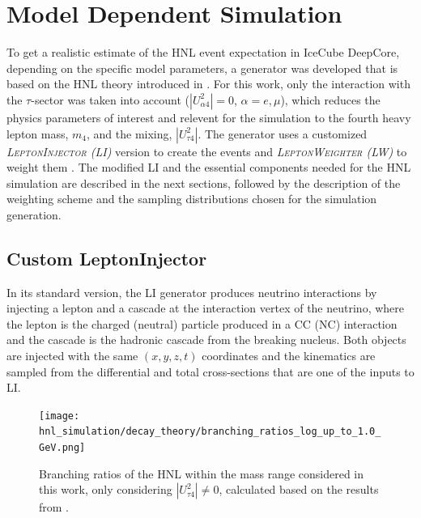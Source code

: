 \section{Model Dependent Simulation} 

To get a realistic estimate of the HNL event expectation in IceCube DeepCore, depending on the specific model parameters, a generator was developed that is based on the HNL theory introduced in . For this work, only the interaction with the $\tau$-sector was taken into account ($|U_{\alpha4}^2|=0$, $\alpha=e,\mu$), which reduces the physics parameters of interest and relevent for the simulation to the fourth heavy lepton mass, $m_4$, and the mixing, $|U_{\tau4}^2|$. The generator uses a customized \textit{\textsc{LeptonInjector} (LI)} version to create the events and \textit{\textsc{LeptonWeighter} (LW)} to weight them . The modified LI and the essential components needed for the HNL simulation are described in the next sections, followed by the description of the weighting scheme and the sampling distributions chosen for the simulation generation.


\subsection{Custom LeptonInjector} 

In its standard version, the LI generator produces neutrino interactions by injecting a lepton and a cascade at the interaction vertex of the neutrino, where the lepton is the charged (neutral) particle produced in a CC (NC) interaction and the cascade is the hadronic cascade from the breaking nucleus. Both objects are injected with the same $(x,y,z,t)$ coordinates and the kinematics are sampled from the differential and total cross-sections that are one of the inputs to LI.

\begin{figure}[h]
    \texttt{[image: hnl\_simulation/decay\_theory/branching\_ratios\_log\_up\_to\_1.0\_GeV.png]}
    \caption[HNL branching ratios]{Branching ratios of the HNL within the mass range considered in this work, only considering $|U_{\tau4}^2| \neq 0$, calculated based on the results from \cite{Coloma:2020lgy}.}
\end{figure}

